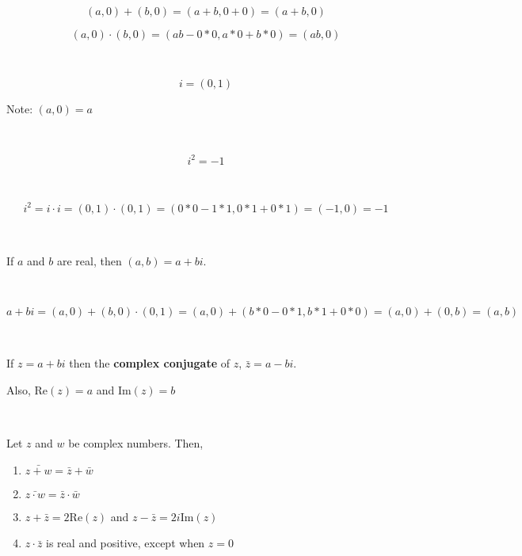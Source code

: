 \documentclass{article}
\begin{document}
\begin{customproof}
\

$$(a,0) + (b,0) = (a+b, 0+0) = (a+b,0)$$

$$(a,0) \cdot (b,0) = (ab - 0*0, a*0+b*0) = (ab, 0)$$
\end{customproof}

\begin{definition}[i]
\

$$i = (0,1)$$
\end{definition}

Note: $(a,0) = a$


\begin{theorem}
\

$$i^2 = -1$$
\end{theorem}

\begin{customproof}
\

$$i^2 = i\cdot i = (0,1) \cdot (0,1) = (0*0 - 1*1, 0*1 + 0*1) = (-1,0) = -1$$
\end{customproof}

\begin{theorem}
\

If $a$ and $b$ are real, then $(a, b) = a+bi$.
\end{theorem}


\begin{customproof}
\

$$a+bi = (a,0) + (b,0) \cdot (0,1) = (a,0) + (b*0 - 0*1, b*1 + 0*0) = (a,0) + (0,b) = (a,b)$$
\end{customproof}

\begin{definition}[Conjugate]
\

If $z = a+bi$ then the \textbf{complex conjugate} of $z$, $\bar{z} = a-bi$. 

Also, $\text{Re}(z) = a$ and $\text{Im}(z) = b$
\end{definition}

\begin{theorem}
\

Let $z$ and $w$ be complex numbers. Then,

\begin{enumerate}
    \item $\bar{z+w} = \bar{z} + \bar{w}$
    \item $\bar{z \cdot w} = \bar{z} \cdot \bar{w}$
    \item $z + \bar{z} = 2\text{Re}(z)$ and $z - \bar{z} = 2i\text{Im}(z)$
    \item $z\cdot \bar{z}$ is real and positive, except when $z = 0$
\end{enumerate}
\end{theorem}
\end{document}
